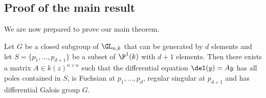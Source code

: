 \documentclass[a4paper, 11pt]{article}
\begin{document}
\subsection{Proof of the main result}

We are now prepared to prove our main theorem.



\begin{theorem}\label{thm:inv}
	Let $G$ be a closed subgroup of $\GL_{n,k}$ that can be generated by $d$ elements and let $S=\{p_1,\ldots,p_{d+1}\}$ be a subset of $\P^1(k)$ with $d+1$ elements. Then there exists a matrix $A\in k(z)^{n\times n}$ such that the differential equation $\del(y)=Ay$ has all poles contained in $S$, is Fuchsian at $p_1,\ldots,p_d$, regular singular at $p_{d+1}$ and has differential Galois group $G$.
\end{theorem}
\end{document}
